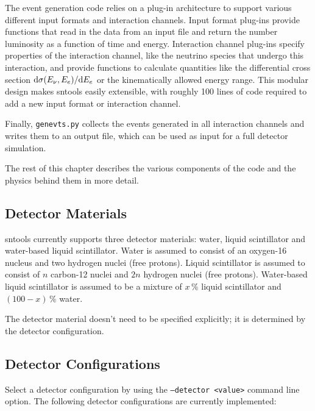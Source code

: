 \documentclass[11pt, oneside]{article}
\renewcommand{\d}{\mathrm{d}}
\newcommand{\tdiffx}[3][\empty]{\ifx\empty#1
		\d #2 / \d #3
	\else
		\d^{#1} #2 / \d #3^{#1}
	\fi} %
\begin{document}
The event generation code relies on a plug-in architecture to support various different input formats and interaction channels.
Input format plug-ins provide functions that read in the data from an input file and return the number luminosity as a function of time and energy.
Interaction channel plug-ins specify properties of the interaction channel, like the neutrino species that undergo this interaction, and provide functions to calculate quantities like the differential cross section $\tdiffx{\sigma (E_\nu, E_e)}{E_e}$ or the kinematically allowed energy range.
This modular design makes sntools easily extensible, with roughly 100 lines of code required to add a new input format or interaction channel.

Finally, \texttt{genevts.py} collects the events generated in all interaction channels and writes them to an output file, which can be used as input for a full detector simulation.

The rest of this chapter describes the various components of the code and the physics behind them in more detail.


\subsection{Detector Materials}
sntools currently supports three detector materials: water, liquid scintillator and water-based liquid scintillator.
Water is assumed to consist of an oxygen-16 nucleus and two hydrogen nuclei (free protons).
Liquid scintillator is assumed to consist of $n$ carbon-12 nuclei and $2n$ hydrogen nuclei (free protons).
Water-based liquid scintillator is assumed to be a mixture of $x\,\%$ liquid scintillator and $(100-x)\,\%$ water.

The detector material doesn’t need to be specified explicitly; it is determined by the detector configuration.


\subsection{Detector Configurations}\label{sec:detector-configurations}
Select a detector configuration by using the \texttt{--detector <value>} command line option. The following detector configurations are currently implemented:
\end{document}
